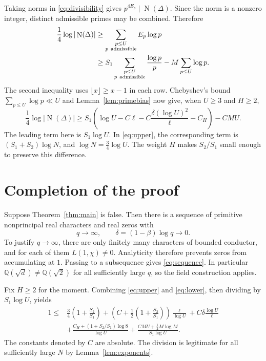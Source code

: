 \documentclass[11pt,a4paper]{amsart}
\theoremstyle{remark}
\newcommand{\Q}{\mathbb Q}
\DeclareMathOperator{\Nm}{N}
\numberwithin{equation}{section}
\begin{document}
Taking norms in \eqref{eq:divisibility} gives
$p^{4E_p}\mid\Nm(\Delta)$. Since the norm is a nonzero integer,
distinct admissible primes may be combined. Therefore
\begin{align}
 \frac14\log|\Nm(\Delta)|
 &\ge\sum_{\substack{p\le U\\p\ \mathrm{admissible}}}E_p\log p\notag\\
 &\ge S_1\sum_{\substack{p\le U\\p\ \mathrm{admissible}}}
                          \frac{\log p}{p}
       -M\sum_{p\le U}\log p.\label{eq:lower-primes}
\end{align}
The second inequality uses $\lfloor x\rfloor\ge x-1$ in each row.
Chebyshev's bound $\sum_{p\le U}\log p\ll U$ and
Lemma~\ref{lem:primebias} now give, when $U\ge3$ and $H\ge2$,
\begin{equation}\label{eq:lower}
 \frac14\log|\Nm(\Delta)|
 \ge S_1\left(\log U-C\ell
       -C\frac{\delta(\log U)^2}{\ell}-C_H\right)-CMU.
\end{equation}
The leading term here is $S_1\log U$. In \eqref{eq:upper}, the
corresponding term is $(S_1+S_2)\log N$, and
$\log N=\tfrac34\log U$. The weight $H$ makes $S_2/S_1$ small
enough to preserve this difference.

\section{Completion of the proof}\label{sec:conclusion}

Suppose Theorem~\ref{thm:main} is false. Then there is a sequence
of primitive nonprincipal real characters and real zeros with
\begin{equation}\label{eq:sequence}
 q\longrightarrow\infty,\qquad
 \delta=(1-\beta)\log q\longrightarrow0.
\end{equation}
To justify $q\to\infty$, there are only finitely many characters
of bounded conductor, and for each of them $L(1,\chi)\ne0$.
Analyticity therefore prevents zeros from accumulating at $1$.
Passing to a subsequence gives \eqref{eq:sequence}. In particular
$\Q(\sqrt d)\ne\Q(\sqrt2)$ for all sufficiently large $q$, so
the field construction applies.

Fix $H\ge2$ for the moment. Combining \eqref{eq:upper} and
\eqref{eq:lower}, then dividing by $S_1\log U$, yields
\begin{equation}\label{eq:master}
\begin{split}
 1\le{}&\frac34\left(1+\frac{S_2}{S_1}\right)
 +\left(C+\frac12\left(1+\frac{S_2}{S_1}\right)\right)
          \frac{\ell}{\log U}
 +C\delta\frac{\log U}{\ell}\\
 &+\frac{C_H+(1+S_2/S_1)\log8}{\log U}
 +\frac{CMU+\tfrac12 M\log M}{S_1\log U}.
\end{split}
\end{equation}
The constants denoted by $C$ are absolute. The division is legitimate
for all sufficiently large $N$ by Lemma~\ref{lem:exponents}.
\end{document}
